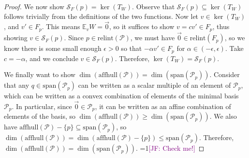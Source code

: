 \documentclass[anon,12pt]{colt2021} %
\newcommand{\Comments}{1}
\newcommand{\mynote}[2]{\ifnum\Comments=1\textcolor{#1}{#2}\fi}
\newcommand{\raf}[1]{\mynote{green}{[RF: #1]}}
\newcommand{\jessie}[1]{\mynote{purple}{[JF: #1]}}
\newcommand{\relint}[1]{\mathrm{relint}(#1)}
\newcommand{\spn}{\mathrm{span}}
\newcommand{\affhull}{\mathrm{affhull}}
\newcommand{\E}{\mathbb{E}}
\renewcommand{\P}{\mathcal{P}}
\newcommand{\Scr}{\mathcal{S}}  %
\begin{document}
\begin{proof}
  We now show $\Scr_F(p) = \ker(T_W)$.
%  
%
  Observe that $\Scr_F(p) \subseteq \ker(T_W)$ follows trivially from the definitions of the two functions. 
  Now let $v \in \ker(T_W)$, and $v' \in F_p$.
  This means $\E_v W = \vec 0$, so it suffices to show $v = c v' \in F_p$, thus showing $v \in \Scr_F(p)$.
  Since $p \in \relint{\P}$, we must have $\vec 0 \in \relint{F_p}$, so we know there is some small enough $\epsilon > 0$ so that $-\alpha v' \in F_p$ for $\alpha \in (-\epsilon, \epsilon)$.
  Take $c = -\alpha$, and we conclude $v \in \Scr_F(p)$.
  Therefore, $\ker(T_W) = \Scr_F(p)$.
  
  We finally want to show $\dim(\affhull(\P)) = \dim(\spn(\P_p))$.
  Consider that any $q \in \spn(\P_p)$ can be written as a scalar multiple of an element of $\P_p$, which can be written as a convex combination of elements of the minimal basis $\P_p$.
  In particular, since $\vec 0 \in \P_p$, it can be written as an affine combination of elements of the basis, so $\dim(\affhull(\P)) \geq \dim(\spn(\P_p))$.
  We also have $\affhull(\P) - \{p\} \subseteq \spn(\P_p)$, so $\dim(\affhull(\P)) = \dim(\affhull(\P) - \{p\}) \leq \spn(\P_p)$.
  Therefore, $\dim(\affhull(\P)) = \dim(\spn(\P_p))$.
  \jessie{Check me!}
  

\end{proof}
\end{document}
